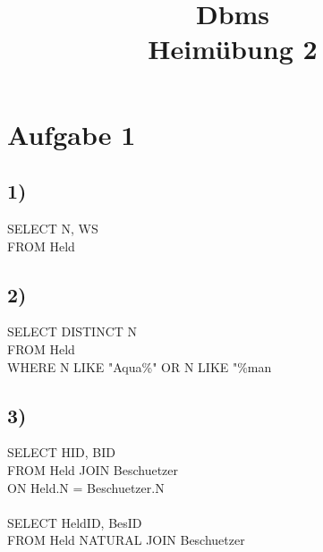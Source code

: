 \documentclass[a4paper,12pt]{article}
\begin{document}
\title{Dbms \\ Heimübung 2}

\maketitle

\section*{Aufgabe 1}
\subsection*{1)}
SELECT N, WS\\
\vspace{0.1em}\hspace{1em}FROM Held\\

\subsection*{2)}
SELECT DISTINCT N\\
\vspace{0.1em}\hspace{1em}FROM Held\\
\vspace{0.1em}\hspace{1em}WHERE N LIKE "Aqua\%" OR N LIKE "\%man\\


\subsection*{3)}
SELECT HID, BID\\
\vspace{0.1em}\hspace{1em}FROM Held JOIN Beschuetzer\\
\vspace{0.1em}\hspace{2em}ON Held.N = Beschuetzer.N\\
\\
SELECT HeldID, BesID\\
\vspace{0.1em}\hspace{1em}FROM Held NATURAL JOIN Beschuetzer\\

\newpage
\end{document}
